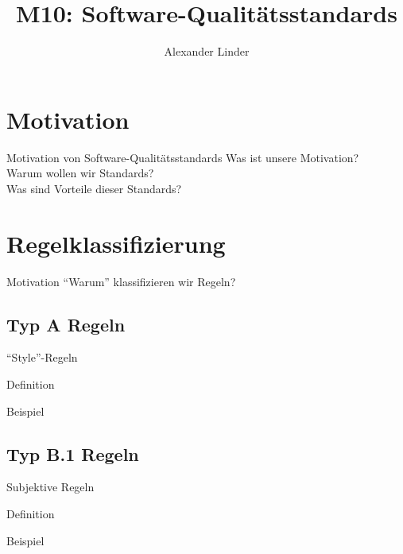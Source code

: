 \documentclass{beamer}
\title{M10: Software-Qualitätsstandards}
\author{Alexander Linder}
\date{} %
\begin{document}

    \begin{frame}
        \maketitle
    \end{frame}

    \begin{frame}
        \tableofcontents
    \end{frame}

    \section{Motivation}
    \label{sec:motivation}
    \begin{frame}{Motivation von Software-Qualitätsstandards}
        Was ist unsere Motivation?\\
        Warum wollen wir Standards?\\
        Was sind Vorteile dieser Standards?
    \end{frame}

    \section{Regelklassifizierung}
    \label{sec:regelklassifizierung}
    \begin{frame}{Motivation}
        \enquote{Warum} klassifizieren wir Regeln?
    \end{frame}

    \subsection{Typ A Regeln}
    \label{subsec:typ-a-regeln}
    \begin{frame}{\enquote{Style}-Regeln}
        \begin{block}{Definition}

        \end{block}
        \begin{exampleblock}{Beispiel}
            
        \end{exampleblock}
    \end{frame}

    \subsection{Typ B.1 Regeln}
    \label{subsec:typ-b-1-regeln}
    \begin{frame}{Subjektive Regeln}
        \begin{block}{Definition}

        \end{block}
        \begin{exampleblock}{Beispiel}
            
        \end{exampleblock}
    \end{frame}
\end{document}
